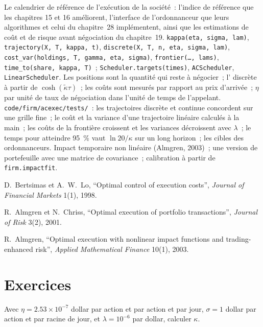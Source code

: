 \begin{build}
 Le calendrier de référence de l'exécution de la société~: l'indice de référence que les chapitres 15 et 16 améliorent, l'interface de l'ordonnanceur que leurs
algorithmes et celui du chapitre~28 implémentent, ainsi que les estimations de coût et de risque avant négociation du chapitre~19.
 \texttt{kappa(eta, sigma, lam)}, \texttt{trajectory(X, T, kappa, t)}, \texttt{discrete(X, T, n, eta, sigma, lam)},
\texttt{cost\_var(holdings, T, gamma, eta, sigma)}, \texttt{frontier(\dots, lams)}, \texttt{time\_to(share, kappa, T)}~; \texttt{Scheduler.targets(times)},
\texttt{ACScheduler}, \texttt{LinearScheduler}.
 Les positions sont la quantité qui reste à négocier~; l' discrète à partir de $\cosh(\tilde\kappa\tau)$~; les coûts sont mesurés par rapport au prix d'arrivée~; $\eta$
par unité de taux de négociation dans l'unité de temps de l'appelant.
 \texttt{code/firm/acexec/tests/}~: les trajectoires discrète et continue concordent sur une grille fine~; le coût et la variance d'une trajectoire linéaire
calculés à la main~; les coûts de la frontière croissent et les variances décroissent avec $\lambda$~; le temps pour atteindre 95~\% vaut $\ln 20/\kappa$ sur un long horizon~; les cibles des ordonnanceurs.
 Impact temporaire non linéaire (Almgren, 2003)~; une version de portefeuille avec une matrice de covariance~; calibration à partir de \texttt{firm.impactfit}.
\end{build}

\begin{omsources}
\item D.~Bertsimas et A.~W.~Lo, ``Optimal control of execution costs'', \emph{Journal of Financial Markets} 1(1), 1998.
\item R.~Almgren et N.~Chriss, ``Optimal execution of portfolio transactions'', \emph{Journal of Risk} 3(2), 2001.
\item R.~Almgren, ``Optimal execution with nonlinear impact functions and trading-enhanced risk'', \emph{Applied Mathematical Finance} 10(1), 2003.
\end{omsources}

\section{Exercices}

\begin{exercise}[$\star$]\label{exo:mx:the-almgren-chriss-framework:1}
Avec $\eta=2.53\times10^{-7}$ dollar par action et par action et par jour, $\sigma=1$ dollar par action et par racine de jour, et $\lambda=10^{-6}$ par dollar, calculer $\kappa$.
\end{exercise}

